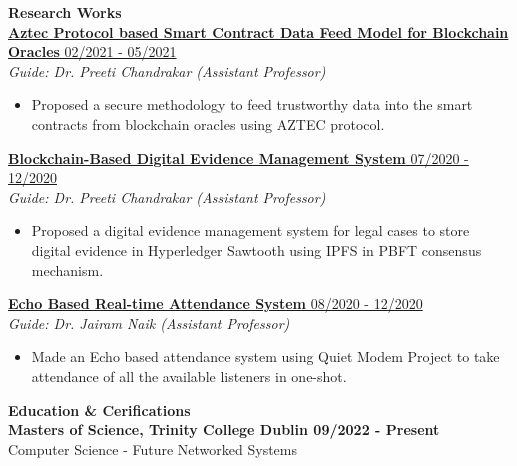 \documentclass{article}
\begin{document}
\noindent \large \textbf{\textcolor{NavyBlue}{Research Works}} \vspace{5pt} \\
\noindent \normalsize \href{https://github.com/Shritesh99/Oracle}{\textbf{Aztec Protocol based Smart Contract Data Feed Model for Blockchain Oracles} \hfill 02/2021 - 05/2021} \\
\textit{Guide: Dr. Preeti Chandrakar (Assistant Professor)} 
\begin{itemize}
    \item Proposed a secure methodology to feed trustworthy data into the smart contracts from blockchain oracles using AZTEC protocol.
\end{itemize}

\noindent \normalsize \href{https://link.springer.com/content/pdf/10.1007/978-3-030-82469-3_30}{\textbf{Blockchain-Based Digital Evidence Management System } \hfill 07/2020 - 12/2020} \\
\textit{Guide: Dr. Preeti Chandrakar (Assistant Professor)} \hfill
\begin{itemize}
    \item Proposed a digital evidence management system for legal cases to store digital evidence in Hyperledger Sawtooth using IPFS in PBFT consensus mechanism.
\end{itemize}

\noindent \normalsize \href{https://dx.doi.org/10.1504/ijiids.2022.10044370}{\textbf{Echo Based Real-time Attendance System} \hfill 08/2020 - 12/2020} \\
\textit{Guide: Dr. Jairam Naik (Assistant Professor)}
\begin{itemize}
    \item  Made an Echo based attendance system using Quiet Modem Project to take attendance of all
the available listeners in one-shot.
\end{itemize}
\noindent \large \textbf{\textcolor{NavyBlue}{Education \& Cerifications}} \vspace{5pt} \\
\normalsize \textbf{Masters of Science, Trinity College Dublin \hfill 09/2022 - Present}\\
Computer Science - Future Networked Systems
\vspace{5pt}
\end{document}
